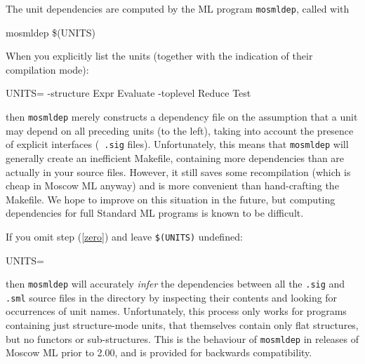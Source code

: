 \documentclass[fleqn,a4paper]{article}
\begin{document}
\noindent The unit dependencies are computed by the ML program
{\tt mosmldep}, called with

\begin{program}
mosmldep \$(UNITS)
\end{program}

\noindent When you explicitly list the units (together with the indication of
their compilation mode):

\begin{program}
UNITS= -structure Expr Evaluate -toplevel Reduce Test
\end{program}

\noindent 
then {\tt mosmldep} merely constructs a dependency file on the
assumption that a unit may depend on all preceding units (to the
left), taking into account the presence of explicit interfaces ({\tt
  .sig} files).  Unfortunately, this means that {\tt mosmldep} will
generally create an inefficient Makefile, containing more dependencies
than are actually in your source files.  However, it still saves some
recompilation (which is cheap in Moscow ML anyway) and is more
convenient than hand-crafting the Makefile.  We hope to improve on
this situation in the future, but computing dependencies for full
Standard ML programs is known to be difficult.

If you omit step (\ref{zero}) and leave {\tt \$(UNITS)} undefined:

\begin{program}
UNITS=
\end{program}

\noindent 
then {\tt mosmldep} will accurately \emph{infer} the dependencies
between all the {\tt .sig} and {\tt .sml} source files in the
directory by inspecting their contents and looking for occurrences
of unit names.  Unfortunately, this process
only works for programs containing just structure-mode units, that
themselves contain only flat structures, but no functors or sub-structures. 
This is the behaviour of {\tt mosmldep} in releases of
Moscow ML prior to 2.00, and is provided for backwards compatibility.


\end{document}
